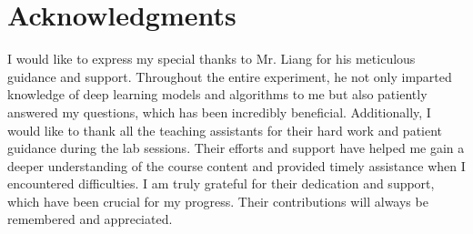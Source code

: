 \documentclass[a4paper,12pt]{article}
\begin{document}
\section*{Acknowledgments}
I would like to express my special thanks to Mr. Liang for his meticulous guidance and support. Throughout the entire experiment, he not only imparted knowledge of deep learning models and algorithms to me but also patiently answered my questions, which has been incredibly beneficial. Additionally, I would like to thank all the teaching assistants for their hard work and patient guidance during the lab sessions. Their efforts and support have helped me gain a deeper understanding of the course content and provided timely assistance when I encountered difficulties. I am truly grateful for their dedication and support, which have been crucial for my progress. Their contributions will always be remembered and appreciated.
\end{document}
